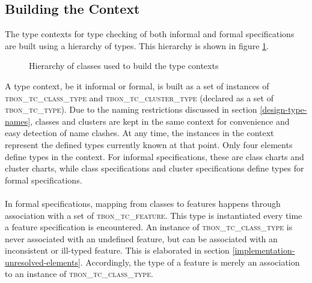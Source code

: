 \subsection{Building the Context}
\label{implementation-context-class-structure}
The type contexts for type checking of both informal and formal specifications are built using a hierarchy of types. This hierarchy is shown in figure \ref{fig:context-classes}.
\begin{figure}[H]
    \centerline{}
    \caption[Context classes]{Hierarchy of classes used to build the type contexts}
    \label{fig:context-classes}
\end{figure}
A type context, be it informal or formal, is built as a set of instances of \textsc{tbon\_tc\_class\_type}  and \textsc{tbon\_tc\_cluster\_type}  (declared as a set of \textsc{tbon\_tc\_type}). Due to the naming restrictions discussed in section \ref{design-type-names}, classes and clusters are kept in the same context for convenience and easy detection of name clashes. At any time, the instances in the context represent the defined types currently known at that point. Only four \bon{} elements define types in the context. For informal specifications, these are class charts and cluster charts, while class specifications and cluster specifications define types for formal specifications.
\paragraph{} In formal specifications, mapping from classes to features happens through association with a set of \textsc{tbon\_tc\_feature}. This type is instantiated every time a feature specification is encountered. An instance of \textsc{tbon\_tc\_class\_type} is never associated with an undefined feature, but can be associated with an inconsistent or ill-typed feature. This is elaborated in section \ref{implementation-unresolved-elements}. Accordingly, the type of a feature is merely an association to an instance of \textsc{tbon\_tc\_class\_type}.
